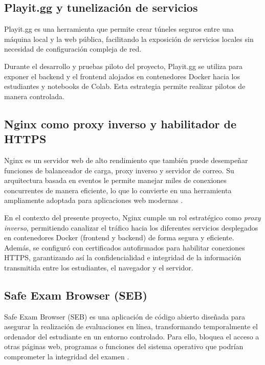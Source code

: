 \documentclass[letter,oneside,12pt,spanish]{report}
\begin{document}
\subsection{Playit.gg y tunelización de servicios}

Playit.gg es una herramienta que permite crear túneles seguros entre una máquina local y la web pública, facilitando la exposición de servicios locales sin necesidad de configuración compleja de red.

Durante el desarrollo y pruebas piloto del proyecto, Playit.gg se utiliza para exponer el backend y el frontend alojados en contenedores Docker hacia los estudiantes y notebooks de Colab. Esta estrategia permite realizar pilotos de manera controlada.

\subsection{Nginx como proxy inverso y habilitador de HTTPS}

Nginx es un servidor web de alto rendimiento que también puede desempeñar funciones de balanceador de carga, proxy inverso y servidor de correo. Su arquitectura basada en eventos le permite manejar miles de conexiones concurrentes de manera eficiente, lo que lo convierte en una herramienta ampliamente adoptada para aplicaciones web modernas \parencite{nginx2025}.

En el contexto del presente proyecto, Nginx cumple un rol estratégico como \textit{proxy inverso}, permitiendo canalizar el tráfico hacia los diferentes servicios desplegados en contenedores Docker (frontend y backend) de forma segura y eficiente. Además, se configuró con certificados autofirmados para habilitar conexiones HTTPS, garantizando así la confidencialidad e integridad de la información transmitida entre los estudiantes, el navegador y el servidor.


\subsection{Safe Exam Browser (SEB)}

Safe Exam Browser (SEB) es una aplicación de código abierto diseñada para asegurar la realización de evaluaciones en línea, transformando temporalmente el ordenador del estudiante en un entorno controlado. Para ello, bloquea el acceso a otras páginas web, programas o funciones del sistema operativo que podrían comprometer la integridad del examen \parencite{seb2023}.
\end{document}
